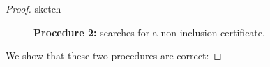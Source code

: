 \begin{proof}{sketch}
\begin{figure}
	\caption{\textbf{Procedure 2:} searches for a non-inclusion certificate.}\label{procedure2}
\end{figure}

\newpage


We show that these two procedures are correct:

\end{proof}



